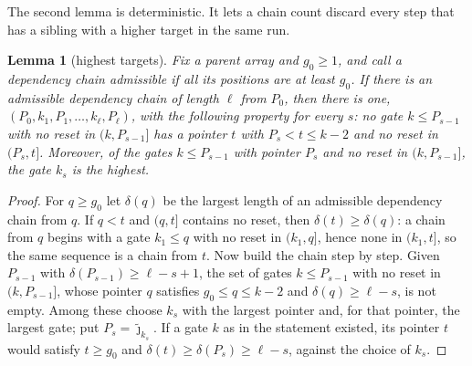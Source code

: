 \documentclass[11pt]{amsart}
\newtheorem{lemma}[theorem]{Lemma}
\theoremstyle{definition}
\theoremstyle{remark}
\newcommand{\jt}{\tilde{\jmath}}
\begin{document}
The second lemma is deterministic. It lets a chain count discard every step that has a sibling
with a higher target in the same run.

\begin{lemma}[highest targets]\label{lem:highest}
Fix a parent array and $g_0\ge1$, and call a dependency chain \emph{admissible} if all its
positions are at least $g_0$. If there is an admissible dependency chain of length $\ell$ from
$P_0$, then there is one, $(P_0,k_1,P_1,\dots,k_\ell,P_\ell)$, with the following property for
every $s$: no gate $k\le P_{s-1}$ with no reset in $(k,P_{s-1}]$ has a pointer $t$ with
$P_s<t\le k-2$ and no reset in $(P_s,t]$. Moreover, of the gates $k\le P_{s-1}$ with pointer
$P_s$ and no reset in $(k,P_{s-1}]$, the gate $k_s$ is the highest.
\end{lemma}

\begin{proof}
For $q\ge g_0$ let $\delta(q)$ be the largest length of an admissible dependency chain from $q$.
If $q<t$ and $(q,t]$ contains no reset, then $\delta(t)\ge\delta(q)$: a chain from $q$ begins with
a gate $k_1\le q$ with no reset in $(k_1,q]$, hence none in $(k_1,t]$, so the same sequence is a
chain from $t$. Now build the chain step by step. Given $P_{s-1}$ with
$\delta(P_{s-1})\ge\ell-s+1$, the set of gates $k\le P_{s-1}$ with no reset in $(k,P_{s-1}]$, whose
pointer $q$ satisfies $g_0\le q\le k-2$ and $\delta(q)\ge\ell-s$, is not empty. Among these choose
$k_s$ with the largest pointer and, for that pointer, the largest gate; put $P_s=\jt_{k_s}$. If a
gate $k$ as in the statement existed, its pointer $t$ would satisfy $t\ge g_0$ and
$\delta(t)\ge\delta(P_s)\ge\ell-s$, against the choice of $k_s$.
\end{proof}
\end{document}
